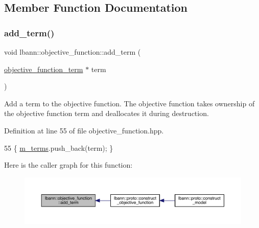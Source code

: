 \subsection{Member Function Documentation}
\mbox{\label{classlbann_1_1objective__function_a98ba95d702f542ed99ccbf9e5cdde21d}} 
\subsubsection{\texorpdfstring{add\+\_\+term()}{add\_term()}}
{\footnotesize\ttfamily void lbann\+::objective\+\_\+function\+::add\+\_\+term (\begin{DoxyParamCaption}\item[{\hyperlink{classlbann_1_1objective__function__term}{objective\+\_\+function\+\_\+term} $\ast$}]{term }\end{DoxyParamCaption})\hspace{0.3cm}{\ttfamily [inline]}}

Add a term to the objective function. The objective function takes ownership of the objective function term and deallocates it during destruction. 

Definition at line 55 of file objective\+\_\+function.\+hpp.


\begin{DoxyCode}
55 \{ \hyperlink{classlbann_1_1objective__function_aea9c1f90ba9af1b1330efa2ba6adb5e2}{m\_terms}.push\_back(term); \}
\end{DoxyCode}
Here is the caller graph for this function\+:\nopagebreak
\begin{figure}[H]
\begin{center}
\leavevmode
\includegraphics[width=350pt]{classlbann_1_1objective__function_a98ba95d702f542ed99ccbf9e5cdde21d_icgraph}
\end{center}
\end{figure}
\mbox{\label{classlbann_1_1objective__function_a7b7f8869bf110846e971fef995db51e1}} 
